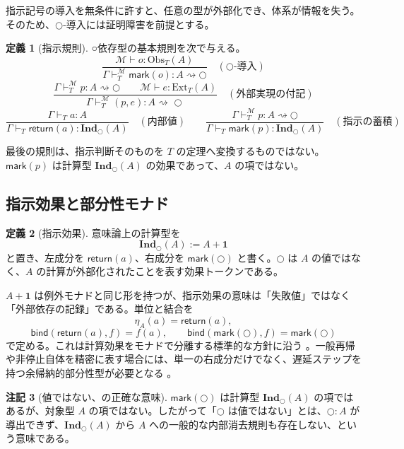 \documentclass[a4paper,11pt]{ltjsarticle}
\theoremstyle{definition}
\newtheorem{definition}{定義}[section]
\newtheorem{remark}[definition]{注記}
\theoremstyle{plain}
\newcommand{\dfix}{\bigcirc}
\newcommand{\Obs}{\mathrm{Obs}}
\newcommand{\Ext}{\mathrm{Ext}}
\newcommand{\Ind}{\mathbf{Ind}_{\dfix}}
\newcommand{\Meta}{\mathcal{M}}
\newcommand{\Unit}{\mathbf{1}}
\begin{document}
指示記号の導入を無条件に許すと、任意の型が外部化でき、体系が情報を失う。そのため、$\dfix$-導入には証明障害を前提とする。

\begin{definition}[指示規則]
○依存型の基本規則を次で与える。
\[
\frac{\Meta\vdash o:\Obs_T(A)}
     {\Gamma\vdash^{\Meta}_T \mathsf{mark}(o):A\rightsquigarrow\dfix}
\quad(\dfix\text{-導入})
\]
\[
\frac{\Gamma\vdash^{\Meta}_T p:A\rightsquigarrow\dfix
      \qquad
      \Meta\vdash e:\Ext_T(A)}
     {\Gamma\vdash^{\Meta}_T (p,e):A\rightsquigarrow_{\!}\dfix}
\quad(\text{外部実現の付記})
\]
\[
\frac{\Gamma\vdash_T a:A}
     {\Gamma\vdash_T \mathsf{return}(a):\Ind(A)}
\quad(\text{内部値})
\qquad
\frac{\Gamma\vdash^{\Meta}_T p:A\rightsquigarrow\dfix}
     {\Gamma\vdash_T \mathsf{mark}(p):\Ind(A)}
\quad(\text{指示の蓄積})
\]
\end{definition}

最後の規則は、指示判断そのものを $T$ の定理へ変換するものではない。$\mathsf{mark}(p)$ は計算型 $\Ind(A)$ の効果であって、$A$ の項ではない。

\subsection{指示効果と部分性モナド}

\begin{definition}[指示効果]
意味論上の計算型を
\[
 \Ind(A):=A+\Unit
\]
と置き、左成分を $\mathsf{return}(a)$、右成分を $\mathsf{mark}(\dfix)$ と書く。$\dfix$ は $A$ の値ではなく、$A$ の計算が外部化されたことを表す効果トークンである。
\end{definition}

$A+\Unit$ は例外モナドと同じ形を持つが、指示効果の意味は「失敗値」ではなく「外部依存の記録」である。単位と結合を
\[
 \eta_A(a)=\mathsf{return}(a),
\]
\[
 \mathsf{bind}(\mathsf{return}(a),f)=f(a),
 \qquad
 \mathsf{bind}(\mathsf{mark}(\dfix),f)=\mathsf{mark}(\dfix)
\]
で定める。これは計算効果をモナドで分離する標準的な方針に沿う \cite{Moggi1991}。一般再帰や非停止自体を精密に表す場合には、単一の右成分だけでなく、遅延ステップを持つ余帰納的部分性型が必要となる \cite{Capretta2005}。

\begin{remark}[値ではない、の正確な意味]
$\mathsf{mark}(\dfix)$ は計算型 $\Ind(A)$ の項ではあるが、対象型 $A$ の項ではない。したがって「$\dfix$ は値ではない」とは、$\dfix:A$ が導出できず、$\Ind(A)$ から $A$ への一般的な内部消去規則も存在しない、という意味である。
\end{remark}
\end{document}
